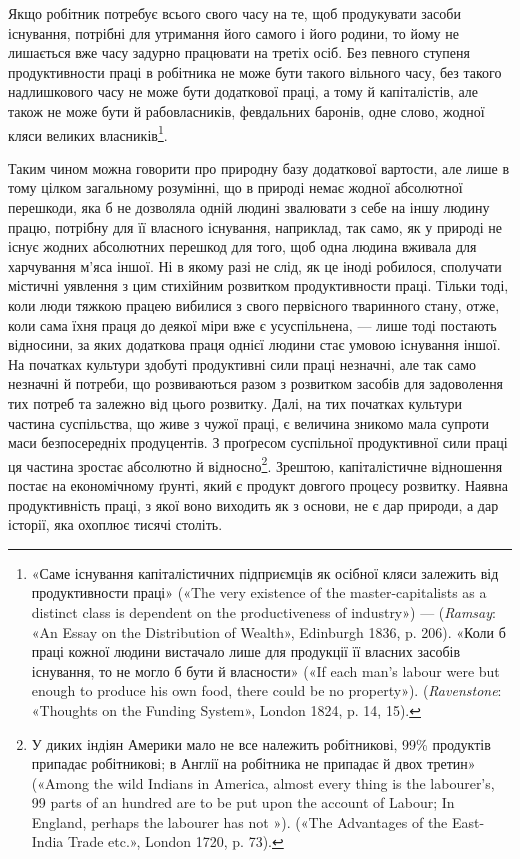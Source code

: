 Якщо робітник потребує всього свого часу на те, щоб продукувати
засоби існування, потрібні для утримання його самого і
його родини, то йому не лишається вже часу задурно працювати
на третіх осіб. Без певного ступеня продуктивности праці в робітника
не може бути такого вільного часу, без такого надлишкового
часу не може бути додаткової праці, а тому й капіталістів,
але також не може бути й рабовласників, февдальних баронів,
одне слово, жодної кляси великих власників\footnote{
«Саме існування капіталістичних підприємців як осібної кляси
залежить від продуктивности праці» («The very existence of the master-capitalists
as a distinct class is dependent on the productiveness
of industry») — (\emph{Ramsay}: «An Essay on the Distribution of Wealth»,
Edinburgh 1836, p. 206). «Коли б праці кожної людини вистачало лише
для продукції її власних засобів існування, то не могло б бути й власности»
(«If each man’s labour were but enough to produce his own food,
there could be no property»). (\emph{Ravenstone}: «Thoughts on the Funding
System», London 1824, p. 14, 15).
}.

Таким чином можна говорити про природну базу додаткової
вартости, але лише в тому цілком загальному розумінні, що в
природі немає жодної абсолютної перешкоди, яка б не дозволяла
одній людині звалювати з себе на іншу людину працю, потрібну
для її власного існування, наприклад, так само, як у природі
не існує жодних абсолютних перешкод для того, щоб одна людина
вживала для харчування м’яса іншої. Ні в якому разі не
слід, як це іноді робилося, сполучати містичні уявлення з
цим стихійним розвитком продуктивности праці. Тільки тоді,
коли люди тяжкою працею вибилися з свого первісного тваринного
стану, отже, коли сама їхня праця до деякої міри вже є
усуспільнена, — лише тоді постають відносини, за яких додаткова
праця однієї людини стає умовою існування іншої. На початках
культури здобуті продуктивні сили праці незначні, але так само
незначні й потреби, що розвиваються разом з розвитком засобів
для задоволення тих потреб та залежно від цього розвитку. Далі,
на тих початках культури частина суспільства, що живе з чужої
праці, є величина зникомо мала супроти маси безпосередніх продуцентів.
З проґресом суспільної продуктивної сили праці ця
частина зростає абсолютно й відносно\footnote{
У диких індіян Америки мало не все належить робітникові, 99\%
продуктів припадає робітникові; в Англії на робітника не припадає й
двох третин» («Among the wild Indians in America, almost every thing
is the labourer’s, 99 parts of an hundred are to be put upon the account of
Labour; In England, perhaps the labourer has not »). («The Advantages
of the East-India Trade etc.», London 1720, p. 73).
}. Зрештою, капіталістичне
відношення постає на економічному ґрунті, який є продукт
довгого процесу розвитку. Наявна продуктивність праці,
з якої воно виходить як з основи, не є дар природи, а дар історії,
яка охоплює тисячі століть.


